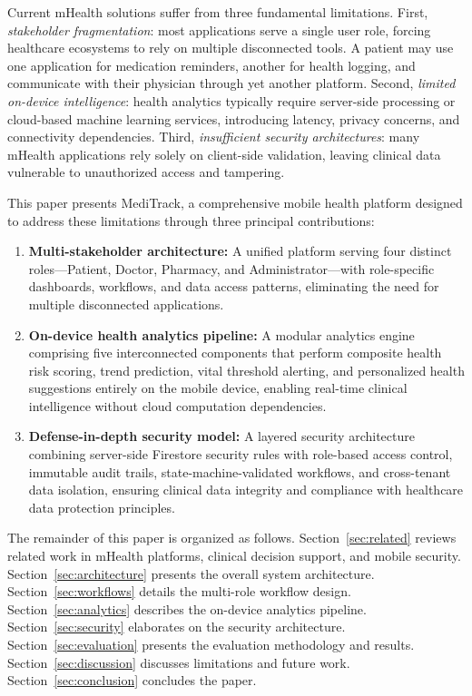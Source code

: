 \documentclass[journal,onecolumn,web]{ieeecolor}
\begin{document}
Current mHealth solutions suffer from three fundamental limitations. First, {\it stakeholder fragmentation}: most applications serve a single user role, forcing healthcare ecosystems to rely on multiple disconnected tools. A patient may use one application for medication reminders, another for health logging, and communicate with their physician through yet another platform. Second, {\it limited on-device intelligence}: health analytics typically require server-side processing or cloud-based machine learning services, introducing latency, privacy concerns, and connectivity dependencies. Third, {\it insufficient security architectures}: many mHealth applications rely solely on client-side validation, leaving clinical data vulnerable to unauthorized access and tampering.

This paper presents MediTrack, a comprehensive mobile health platform designed to address these limitations through three principal contributions:

\begin{enumerate}
\item {\bf Multi-stakeholder architecture:} A unified platform serving four distinct roles---Patient, Doctor, Pharmacy, and Administrator---with role-specific dashboards, workflows, and data access patterns, eliminating the need for multiple disconnected applications.

\item {\bf On-device health analytics pipeline:} A modular analytics engine comprising five interconnected components that perform composite health risk scoring, trend prediction, vital threshold alerting, and personalized health suggestions entirely on the mobile device, enabling real-time clinical intelligence without cloud computation dependencies.

\item {\bf Defense-in-depth security model:} A layered security architecture combining server-side Firestore security rules with role-based access control, immutable audit trails, state-machine-validated workflows, and cross-tenant data isolation, ensuring clinical data integrity and compliance with healthcare data protection principles.
\end{enumerate}

The remainder of this paper is organized as follows. Section~\ref{sec:related} reviews related work in mHealth platforms, clinical decision support, and mobile security. Section~\ref{sec:architecture} presents the overall system architecture. Section~\ref{sec:workflows} details the multi-role workflow design. Section~\ref{sec:analytics} describes the on-device analytics pipeline. Section~\ref{sec:security} elaborates on the security architecture. Section~\ref{sec:evaluation} presents the evaluation methodology and results. Section~\ref{sec:discussion} discusses limitations and future work. Section~\ref{sec:conclusion} concludes the paper.
\end{document}
